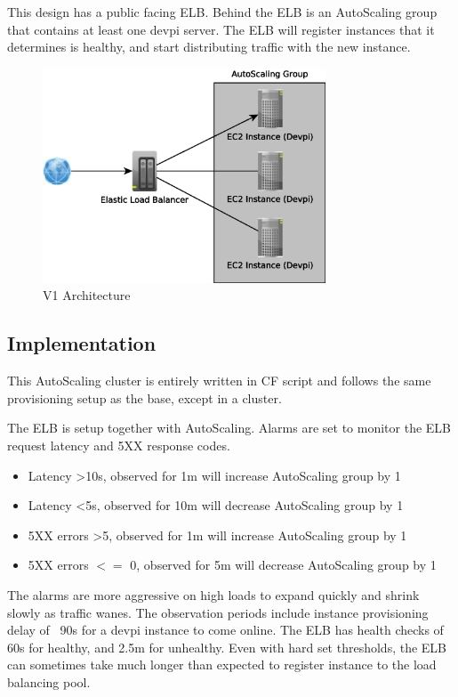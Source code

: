 \documentclass[12pt, letterpaper]{article}
\begin{document}
This design has a public facing ELB. Behind the ELB is an AutoScaling group that contains at least one devpi
server. The ELB will register instances that it determines is healthy, and start distributing traffic with the new instance.   

\begin{figure}[H]
    \caption{V1 Architecture}
    \centering
    \includegraphics[width=0.75\textwidth]{figures/v1_arch.eps}
\end{figure}

\subsection{Implementation}
This AutoScaling cluster is entirely written in CF script and follows the same provisioning setup as the base, except in a cluster.

The ELB is setup together with AutoScaling. Alarms are set to monitor the ELB request latency and 5XX response codes.

\begin{itemize}
    \item Latency \textgreater 10s, observed for 1m will increase AutoScaling group by 1
    \item Latency \textless 5s, observed for 10m will decrease AutoScaling group by 1
    \item 5XX errors \textgreater 5, observed for 1m will increase AutoScaling group by 1
    \item 5XX errors $<=$ 0, observed for 5m will decrease AutoScaling group by 1
\end{itemize}

The alarms are more aggressive on high loads to expand quickly and shrink slowly as traffic wanes. The observation periods
include instance provisioning delay of ~90s for a devpi instance to come online. The ELB has health checks of 60s for healthy, and
2.5m for unhealthy. Even with hard set thresholds, the ELB can sometimes take much longer than expected to register instance 
to the load balancing pool.
\end{document}
